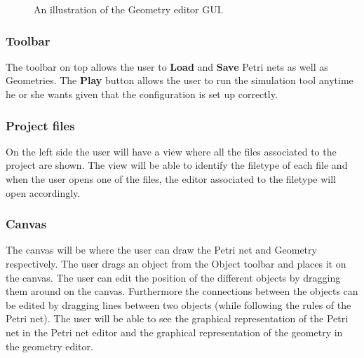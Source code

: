 \begin{figure}[ht]
\begin{minipage}[b]{0.45\linewidth}
\caption{An illustration of the Geometry editor GUI.}
\label{fig:geometry_editor}
	\end{minipage}

\end{figure}



%
%

\subsubsection{Toolbar}
The toolbar on top allows the user to \textbf{Load} and \textbf{Save} Petri nets as well as Geometries. The \textbf{Play} button allows the user to run the simulation tool anytime he or she wants given that the configuration is set up correctly. 

\subsubsection{Project files}
On the left side the user will have a view where all the files associated to the project are shown. The view will be able to identify the filetype of each file and when the user opens one of the files, the editor associated to the filetype will open accordingly. 

\subsubsection{Canvas}
The canvas will be where the user can draw the Petri net and Geometry respectively. The user drags an object from the Object toolbar and places it on the canvas. The user can edit the position of the different objects by dragging them around on the canvas. Furthermore the connections between the objects can be edited by dragging lines between two objects (while following the rules of the Petri net). The user will be able to see the graphical representation of the Petri net in the Petri net editor and the graphical representation of the geometry in the geometry editor. 

